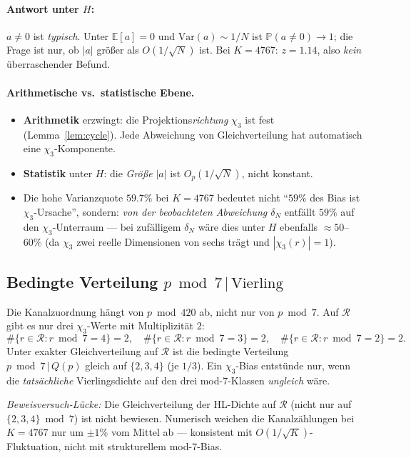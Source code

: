 \documentclass[11pt,a4paper]{article}
\newcommand{\R}{\mathcal{R}}
\newcommand{\E}{\mathbb{E}}
\newcommand{\Var}{\mathrm{Var}}
\begin{document}
\paragraph{Antwort unter $H$:} $a\neq 0$ ist \emph{typisch}.
Unter $\E[a]=0$ und $\Var(a)\sim 1/N$ ist
$\mathbb{P}(a\neq 0)\to 1$;
die Frage ist nur, ob $|a|$ größer als $O(1/\sqrt{N})$ ist.
Bei $K=4767$: $z=1.14$, also \emph{kein} überraschender Befund.

\paragraph{Arithmetische vs.\ statistische Ebene.}
\begin{itemize}
  \item \textbf{Arithmetik} erzwingt: die Projektions\emph{richtung} $\chi_3$
        ist fest (Lemma~\ref{lem:cycle}). Jede Abweichung von Gleichverteilung
        hat automatisch eine $\chi_3$-Komponente.
  \item \textbf{Statistik} unter $H$: die \emph{Größe} $|a|$ ist
        $O_p(1/\sqrt{N})$, nicht konstant.
  \item Die hohe Varianzquote $59.7\%$ bei $K=4767$ bedeutet nicht
        ``$59\%$ des Bias ist $\chi_3$-Ursache'', sondern:
        \emph{von der beobachteten Abweichung $\delta_N$}
        entfällt $59\%$ auf den $\chi_3$-Unterraum --- bei
        zufälligem $\delta_N$ wäre dies unter $H$ ebenfalls
        $\approx 50$--$60\%$ (da $\chi_3$ zwei reelle Dimensionen
        von sechs trägt und $|{\chi_3(r)}|=1$).
\end{itemize}

\subsection{Bedingte Verteilung $p\bmod 7\,|\,\text{Vierling}$}

Die Kanalzuordnung hängt von $p\bmod 420$ ab, nicht nur von $p\bmod 7$.
Auf $\R$ gibt es nur drei $\chi_3$-Werte mit Multiplizität $2$:
\[
  \#\{r\in\R: r\bmod 7 = 4\} = 2,\quad
  \#\{r\in\R: r\bmod 7 = 3\} = 2,\quad
  \#\{r\in\R: r\bmod 7 = 2\} = 2.
\]
Unter exakter Gleichverteilung auf $\R$ ist die bedingte Verteilung
$p\bmod 7\,|\,Q(p)$ gleich auf $\{2,3,4\}$ (je $1/3$).
Ein $\chi_3$-Bias entstünde nur, wenn die \emph{tatsächliche}
Vierlingsdichte auf den drei mod-$7$-Klassen \emph{ungleich} wäre.

\emph{Beweisversuch-Lücke:} Die Gleichverteilung der HL-Dichte auf
$\R$ (nicht nur auf $\{2,3,4\}\bmod 7$) ist nicht bewiesen.
Numerisch weichen die Kanalzählungen bei $K=4767$ nur um $\pm 1\%$
vom Mittel ab --- konsistent mit $O(1/\sqrt{K})$-Fluktuation,
nicht mit strukturellem mod-$7$-Bias.
\end{document}

